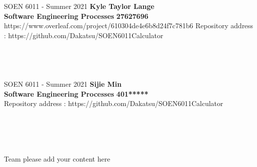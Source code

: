 \documentclass[a4paper, 11pt]{report}
\begin{document}
\section*{}
\normalsize {SOEN 6011 - Summer 2021} \hfill \textbf{Kyle Taylor Lange} \\
\textbf{ Software Engineering Processes}  \hfill \textbf{27627696} \\https://www.overleaf.com/project/610304de4e6b8d24f7c781b6
\hfill Repository address : https://github.com/Dakatsu/SOEN6011Calculator
\\\\\\

\pagebreak

\section*{}
\normalsize {SOEN 6011 - Summer 2021} \hfill \textbf{Sijie Min} \\
\textbf{ Software Engineering Processes}  \hfill \textbf{401*****} \\
\hfill Repository address : https://github.com/Dakatsu/SOEN6011Calculator
\\\\\\\\\\
 \begin{center} Team please add your content here \end{center}
\pagebreak
\end{document}
